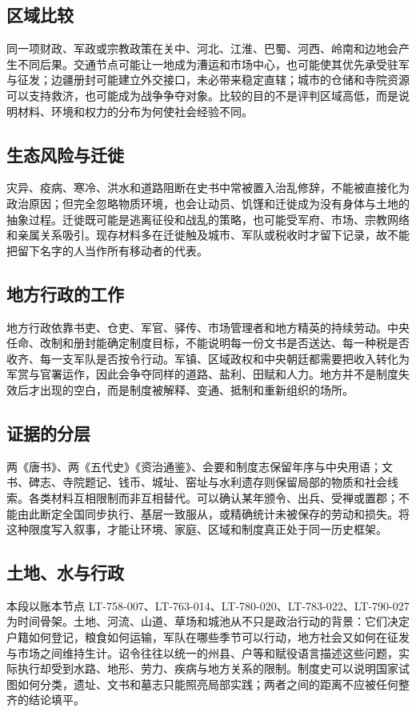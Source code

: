 \subsection{区域比较}
同一项财政、军政或宗教政策在关中、河北、江淮、巴蜀、河西、岭南和边地会产生不同后果。交通节点可能让一地成为漕运和市场中心，也可能使其优先承受驻军与征发；边疆册封可能建立外交接口，未必带来稳定直辖；城市的仓储和寺院资源可以支持救济，也可能成为战争争夺对象。比较的目的不是评判区域高低，而是说明材料、环境和权力的分布为何使社会经验不同。

\subsection{生态风险与迁徙}
灾异、疫病、寒冷、洪水和道路阻断在史书中常被置入治乱修辞，不能被直接化为政治原因；但完全忽略物质环境，也会让动员、饥馑和迁徙成为没有身体与土地的抽象过程。迁徙既可能是逃离征役和战乱的策略，也可能受军府、市场、宗教网络和亲属关系吸引。现存材料多在迁徙触及城市、军队或税收时才留下记录，故不能把留下名字的人当作所有移动者的代表。

\subsection{地方行政的工作}
地方行政依靠书吏、仓吏、军官、驿传、市场管理者和地方精英的持续劳动。中央任命、改制和册封能确定制度目标，不能说明每一份文书是否送达、每一种税是否收齐、每一支军队是否按令行动。军镇、区域政权和中央朝廷都需要把收入转化为军赏与官署运作，因此会争夺同样的道路、盐利、田赋和人力。地方并不是制度失效后才出现的空白，而是制度被解释、变通、抵制和重新组织的场所。

\subsection{证据的分层}
两《唐书》、两《五代史》《资治通鉴》、会要和制度志保留年序与中央用语；文书、碑志、寺院题记、钱币、城址、窑址与水利遗存则保留局部的物质和社会线索。各类材料互相限制而非互相替代。可以确认某年颁令、出兵、受禅或置郡；不能由此断定全国同步执行、基层一致服从，或精确统计未被保存的劳动和损失。将这种限度写入叙事，才能让环境、家庭、区域和制度真正处于同一历史框架。
\subsection{土地、水与行政}
本段以账本节点 LT-758-007、LT-763-014、LT-780-020、LT-783-022、LT-790-027 为时间骨架。土地、河流、山道、草场和城池从不只是政治行动的背景：它们决定户籍如何登记，粮食如何运输，军队在哪些季节可以行动，地方社会又如何在征发与市场之间维持生计。诏令往往以统一的州县、户等和赋役语言描述这些问题，实际执行却受到水路、地形、劳力、疾病与地方关系的限制。制度史可以说明国家试图如何分类，遗址、文书和墓志只能照亮局部实践；两者之间的距离不应被任何整齐的结论填平。

